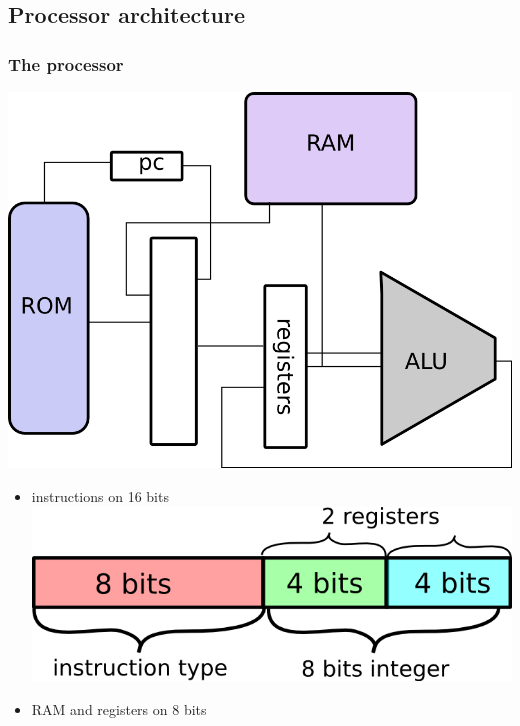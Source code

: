 \documentclass[c]{beamer}
\begin{document}
\subsection{Processor architecture}

\begin{frame}
\frametitle{The processor}
\includegraphics[scale=0.4]{schema_proc.png}

\end{frame}

\begin{frame}
\begin{itemize}
\item instructions on 16 bits \\
   \vspace{0.5 cm}
  \hspace{1.5 cm} \includegraphics[scale= 0.4]{instructions.png}
  \newline
\item RAM and registers on 8 bits 
\end{itemize}
\end{frame} 
\end{document}
